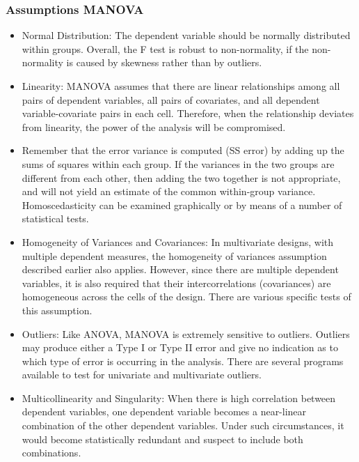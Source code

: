 \begin{frame}[allowframebreaks]\frametitle{Assumptions MANOVA}
  \begin{itemize}
  \item Normal Distribution: The dependent variable should be normally distributed within groups.  Overall, the F test is robust to non-normality, if the non-normality is caused by skewness rather than by outliers.
  \item Linearity: MANOVA assumes that there are linear relationships among all pairs of dependent variables, all pairs of covariates, and all dependent variable-covariate pairs in each cell.  Therefore, when the relationship deviates from linearity, the power of the analysis will be compromised.
  \item Remember that the error variance is computed (SS error) by adding up the sums of squares within each group. If the variances in the two groups are different from each other, then adding the two together is not appropriate, and will not yield an estimate of the common within-group variance.  Homoscedasticity can be examined graphically or by means of a number of statistical tests.
  \item Homogeneity of Variances and Covariances: In multivariate designs, with multiple dependent measures, the homogeneity of variances assumption described earlier also applies. However, since there are multiple dependent variables, it is also required that their intercorrelations (covariances) are homogeneous across the cells of the design. There are various specific tests of this assumption.
  \item Outliers: Like ANOVA, MANOVA is extremely sensitive to outliers.  Outliers may produce either a Type I or Type II error and give no indication as to which type of error is occurring in the analysis.  There are several programs available to test for univariate and multivariate outliers.
  \item Multicollinearity and Singularity: When there is high correlation between dependent variables, one dependent variable becomes a near-linear combination of the other dependent variables.  Under such circumstances, it would become statistically redundant and suspect to include both combinations.
  \end{itemize}

\end{frame}

